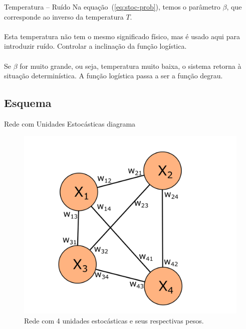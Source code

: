\begin{frame}{Temperatura -- Ruído}%
  \justifying%
  Na equação~(\ref{eq:stoc-prob}), temos o parâmetro $\beta$, que corresponde ao inverso da temperatura $T$.
  \\~\\
  Esta temperatura não tem o mesmo significado físico, mas é usado aqui para introduzir ruído. Controlar a inclinação da função logística.
  \\~\\
  Se $\beta$ for muito grande, ou seja, temperatura muito baixa, o sistema retorna à situação determinística. A função logística passa a ser a função degrau.
\end{frame}

\subsection{Esquema}
\begin{frame}{Rede com Unidades Estocásticas diagrama}%
  \begin{figure}%
    \label{fig:stoc-diagram}%
    \includegraphics[scale=0.5]{images/stochastic_full.png}
    \caption{Rede com 4 unidades estocásticas e seus respectivas pesos.}
  \end{figure}
\end{frame}

